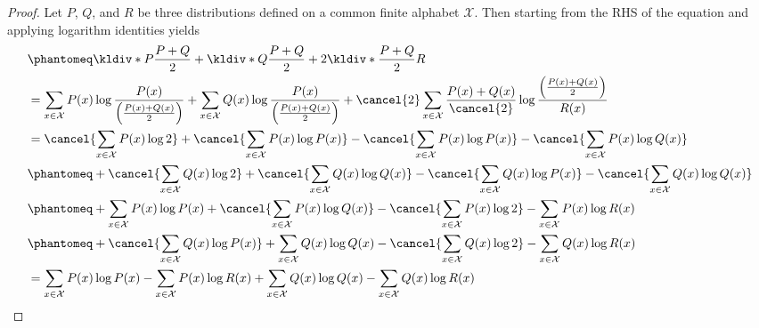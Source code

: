 \documentclass[
  coursecode={MTHE 474},
  assignmentname={Homework \homeworknumber},
  studentnumber=20053722,
  name={Bryan Hoang},
  11pt,
]{
  ltxanswer%
}
\begin{document}
  \begin{questions}
    \setcounter{question}{\questionnumber}
    \addtocounter{question}{-1}
    \question[10]{}
    \begin{solution}
      \begin{proof}
        Let \(P\), \(Q\), and \(R\) be three distributions defined on a common finite alphabet \(\mathcal{X}\). Then starting from the RHS of the equation and applying logarithm identities yields
        \begin{align*}
           &\phantomeq \kldiv*{P}{\frac{P+Q}{2}} + \kldiv*{Q}{\frac{P+Q}{2}} + 2\kldiv*{\frac{P+Q}{2}}{R}                                                                                                                                                                                  \\
           &= \sum_{x\in\mathcal{X}} P(x)\log\frac{P(x)}{\left(\frac{P(x)+Q(x)}{2}\right)} + \sum_{x\in\mathcal{X}} Q(x)\log\frac{P(x)}{\left(\frac{P(x)+Q(x)}{2}\right)} + \cancel{2}\sum_{x\in\mathcal{X}} \frac{P(x)+Q(x)}{\cancel{2}}\log\frac{\left(\frac{P(x)+Q(x)}{2}\right)}{R(x)} \\
           &= \cancel{\sum_{x\in\mathcal{X}} P(x) \log 2} + \cancel{\sum_{x\in\mathcal{X}} P(x) \log P(x)} - \cancel{\sum_{x\in\mathcal{X}} P(x) \log P(x)} - \cancel{\sum_{x\in\mathcal{X}} P(x) \log Q(x)}                                                                               \\
           &\phantomeq + \cancel{\sum_{x\in\mathcal{X}} Q(x) \log 2} + \cancel{\sum_{x\in\mathcal{X}} Q(x) \log Q(x)} - \cancel{\sum_{x\in\mathcal{X}} Q(x) \log P(x)} - \cancel{\sum_{x\in\mathcal{X}} Q(x) \log Q(x)}                                                                    \\
           &\phantomeq + \sum_{x\in\mathcal{X}} P(x) \log P(x) + \cancel{\sum_{x\in\mathcal{X}} P(x) \log Q(x)} - \cancel{\sum_{x\in\mathcal{X}} P(x) \log 2} - \sum_{x\in\mathcal{X}} P(x) \log R(x)                                                                                      \\
           &\phantomeq + \cancel{\sum_{x\in\mathcal{X}} Q(x) \log P(x)} + \sum_{x\in\mathcal{X}} Q(x) \log Q(x) - \cancel{\sum_{x\in\mathcal{X}} Q(x) \log 2} - \sum_{x\in\mathcal{X}} Q(x) \log R(x)                                                                                      \\
           &= \sum_{x\in\mathcal{X}} P(x) \log P(x) - \sum_{x\in\mathcal{X}} P(x) \log R(x) + \sum_{x\in\mathcal{X}} Q(x) \log Q(x) - \sum_{x\in\mathcal{X}} Q(x) \log R(x)                                                                                                                \\

\end{align*}
\end{proof}
\end{solution}
\end{questions}
\end{document}
